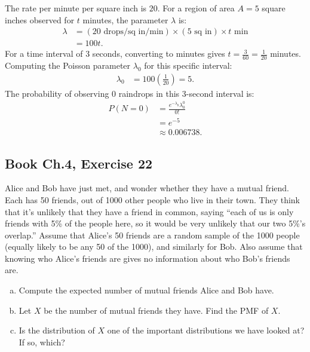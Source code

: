 \documentclass[11pt,a4paper]{article}
\begin{document}
The rate per minute per square inch is $20$. For a region of area $A = 5$ square inches observed for $t$ minutes, the parameter $\lambda$ is:
\begin{align*}
\lambda &= (20 \text{ drops}/\text{sq in}/\text{min}) \times (5 \text{ sq in}) \times t \text{ min} \\
&= 100t.
\end{align*}
For a time interval of 3 seconds, converting to minutes gives $t = \frac{3}{60} = \frac{1}{20}$ minutes. Computing the Poisson parameter $\lambda_0$ for this specific interval:
\begin{align*}
\lambda_0 &= 100 \left(\frac{1}{20}\right) = 5.
\end{align*}
The probability of observing $0$ raindrops in this 3-second interval is:
\begin{align*}
P(N = 0) &= \frac{e^{-\lambda_0} \lambda_0^0}{0!} \\
&= e^{-5} \\
&\approx 0.006738.
\end{align*}

\vspace{10pt}
\subsection{Book Ch.4, Exercise 22}
\begin{tcolorbox}[title={Book Ch.4, Exercise 22}]
Alice and Bob have just met, and wonder whether they have a mutual friend. Each has 50 friends, out of 1000 other people who live in their town. They think that it's unlikely that they have a friend in common, saying ``each of us is only friends with 5\% of the people here, so it would be very unlikely that our two 5\%'s overlap.''
Assume that Alice's 50 friends are a random sample of the 1000 people (equally likely to be any 50 of the 1000), and similarly for Bob. Also assume that knowing who Alice's friends are gives no information about who Bob's friends are.
\begin{enumerate}[(a)]
\item Compute the expected number of mutual friends Alice and Bob have.
\item Let $X$ be the number of mutual friends they have. Find the PMF of $X$.
\item Is the distribution of $X$ one of the important distributions we have looked at? If so, which?
\end{enumerate}
\end{tcolorbox}
\end{document}
